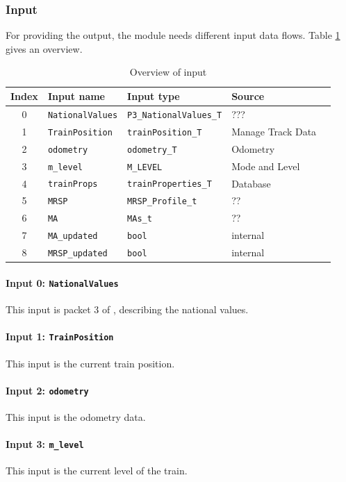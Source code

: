 \subsubsection{Input}
For providing the output, the module needs different input data flows. Table \ref{tbl:speedsupervisionInput} gives an overview.

\begin{table}[H]
  \begin{tabular}{| c | l | l | l | l |}
    \hline
    \textbf{Index} & \textbf{Input name} & \textbf{Input type} & \textbf{Source}\\ \hline
    0 & \texttt{NationalValues} & \texttt{P3\_NationalValues\_T} & ???\\
    1 & \texttt{TrainPosition} & \texttt{trainPosition\_T} & Manage Track Data\\
    2 & \texttt{odometry} & \texttt{odometry\_T} & Odometry\\
    3 & \texttt{m\_level} & \texttt{M\_LEVEL} & Mode and Level\\
    4 & \texttt{trainProps} & \texttt{trainProperties\_T} & Database\\
    5 & \texttt{MRSP} & \texttt{MRSP\_Profile\_t} & ?? \\
    6 & \texttt{MA} & \texttt{MAs\_t} & ??\\
    7 & \texttt{MA\_updated} & \texttt{bool} & internal\\
    8 & \texttt{MRSP\_updated} & \texttt{bool} & internal\\
    \hline
  \end{tabular} 
  \caption{Overview of input}
  \label{tbl:speedsupervisionInput}
\end{table}

\paragraph{Input 0: \texttt{NationalValues}}
This input is packet 3 of \cite[Chapt.~8]{subset-026}, describing the national values. 
\paragraph{Input 1: \texttt{TrainPosition}}
This input is the current train position.
\paragraph{Input 2: \texttt{odometry}}
This input is the odometry data.
\paragraph{Input 3: \texttt{m\_level}}
This input is the current level of the train.
